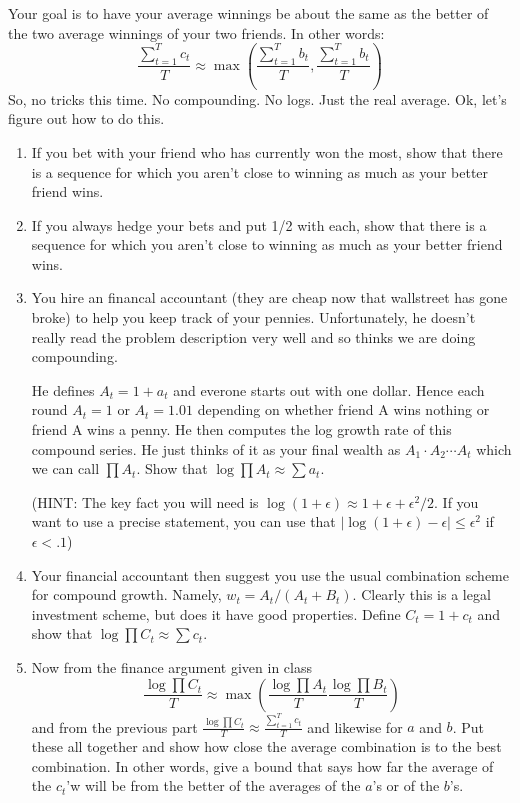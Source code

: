 \documentclass[12pt]{extarticle}
\begin{document}
Your goal is to have your average winnings be about the same as the
better of the two average winnings of your two friends.  In other words:
\begin{displaymath}
\frac{\sum_{t=1}^T c_t}{T} \approx \max(\frac{\sum_{t=1}^T b_t}{T},\frac{\sum_{t=1}^T b_t}{T})
\end{displaymath}
So, no tricks this time.  No compounding.  No logs.  Just the real
average.  Ok, let's figure out how to do this.
\begin{enumerate}
\item If you bet with your friend who has currently won the most, show
that there is a sequence for which you aren't close to winning as much
as your better friend wins.
\item If you always hedge your bets and put 1/2 with each, show that
there is a sequence for which you aren't close to winning as much
as your better friend wins.
\item You hire an financal accountant (they are cheap now that
 wallstreet has gone broke) to help you keep track of your pennies.
  Unfortunately, he doesn't really read the problem description very
 well and so thinks we are doing compounding.  

 He defines $A_t = 1 + a_t$ and everone starts out with one dollar.
  Hence each round $A_t = 1$ or $A_t = 1.01$ depending on whether
 friend A wins nothing or friend A wins a penny.  He then computes the
 log growth rate of this compound series.  He just thinks of it as
 your final wealth as $A_1 \cdot A_2 \cdots A_t$ which we can call
 $\prod A_t$.  Show that $\log \prod A_t \approx \sum a_t$.

(HINT: The key fact you will need is $\log(1+\epsilon) \approx 1 +
\epsilon + \epsilon^2/2$.  If you want to use a precise statement, you
can use that $|\log(1+\epsilon) - \epsilon| \le \epsilon^2$ if
$\epsilon < .1$)

\item Your financial accountant then suggest you use the usual
 combination scheme for compound growth.  Namely, $w_t =
 A_t/(A_t+B_t)$.  Clearly this is a legal investment scheme, but does
 it have good properties.  Define $C_t = 1 + c_t$ and show that $\log
 \prod C_t \approx \sum c_t$.
\item Now from the finance argument given in class
\begin{displaymath}
\frac{\log \prod C_t}{T} \approx \max(
\frac{\log \prod A_t}{T}
\frac{\log \prod B_t}{T})
\end{displaymath}
and from the previous part $\frac{\log \prod C_t}{T} \approx
\frac{\sum_{t=1}^T c_t}{T}$ and likewise for $a$ and $b$.  Put these
all together and show how close the average combination is to the best
combination.  In other words, give a bound that says how far the average
of the $c_t$'w will be from the better of the averages of the $a$'s or
of the $b$'s.
\end{enumerate}
\end{document}
